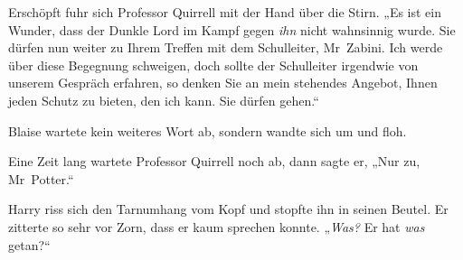 Erschöpft fuhr sich Professor Quirrell mit der Hand über die Stirn.
„Es ist ein Wunder, dass der Dunkle Lord im Kampf gegen \emph{ihn} nicht wahnsinnig wurde. Sie dürfen nun weiter zu Ihrem Treffen mit dem Schulleiter, Mr~Zabini. Ich werde über diese Begegnung schweigen, doch sollte der Schulleiter irgendwie von unserem Gespräch erfahren, so denken Sie an mein stehendes Angebot, Ihnen jeden Schutz zu bieten, den ich kann. Sie dürfen gehen.“

Blaise wartete kein weiteres Wort ab, sondern wandte sich um und floh.

\later

Eine Zeit lang wartete Professor Quirrell noch ab, dann sagte er,
„Nur zu, Mr~Potter.“

Harry riss sich den Tarnumhang vom Kopf und stopfte ihn in seinen Beutel. Er zitterte so sehr vor Zorn, dass er kaum sprechen konnte.
„\emph{Was?} Er hat \emph{was} getan?“

